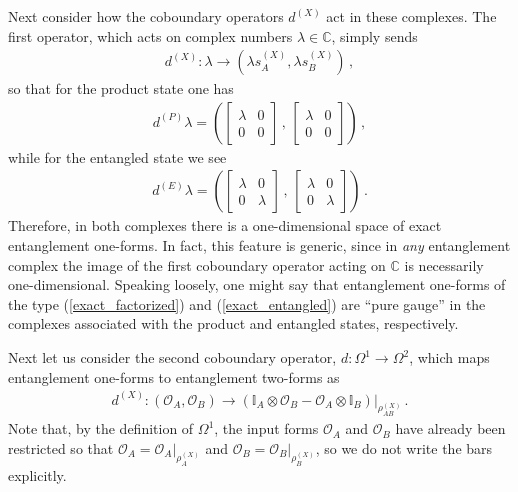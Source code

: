 \documentclass[12pt]{article}
\numberwithin{equation}{section}
\begin{document}
Next consider how the coboundary operators $d^{(X)}$ act in these complexes. The first operator, which acts on complex numbers $\lambda \in \mathbb{C}$, simply sends
%
\begin{align}
    d^{(X)} : \lambda \to ( \lambda s_A^{(X)} , \lambda s_B^{(X)} ) \, ,
\end{align}
%
so that for the product state one has
%
\begin{align}\label{exact_factorized}
    d^{(P)} \lambda = \left( \begin{bmatrix} \lambda & 0 \\ 0 & 0 \end{bmatrix} \, , \, \begin{bmatrix} \lambda & 0 \\ 0 & 0 \end{bmatrix} \right) \, ,
\end{align}
%
while for the entangled state we see
%
\begin{align}\label{exact_entangled}
    d^{(E)} \lambda = \left( \begin{bmatrix} \lambda & 0 \\ 0 & \lambda \end{bmatrix} \, , \, \begin{bmatrix} \lambda & 0 \\ 0 & \lambda \end{bmatrix} \right) \, .
\end{align}
%
Therefore, in both complexes there is a one-dimensional space of exact entanglement one-forms. In fact, this feature is generic, since in \emph{any} entanglement complex the image of the first coboundary operator acting on $\mathbb{C}$ is necessarily one-dimensional. Speaking loosely, one might say that entanglement one-forms of the type (\ref{exact_factorized}) and (\ref{exact_entangled}) are ``pure gauge'' in the complexes associated with the product and entangled states, respectively.

Next let us consider the second coboundary operator, $d : \Omega^1 \to \Omega^2$, which maps entanglement one-forms to entanglement two-forms as
%
\begin{align}
    d^{(X)} : \left( \mathcal{O}_A , \mathcal{O}_B \right) \to \left( \mathbb{I}_A \otimes \mathcal{O}_B - \mathcal{O}_A \otimes \mathbb{I}_B \right) \big\vert_{\rho_{AB}^{(X)}} \, .
\end{align}
%
Note that, by the definition of $\Omega^1$, the input forms $\mathcal{O}_A$ and $\mathcal{O}_B$ have already been restricted so that $\mathcal{O}_A = \mathcal{O}_A \big\vert_{\rho_A^{(X)}}$ and $\mathcal{O}_B = \mathcal{O}_B \big\vert_{\rho_B^{(X)}}$, so we do not write the bars explicitly.
\end{document}
